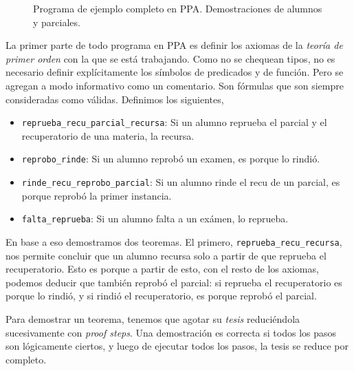 \begin{figure}[H]
    
    \caption{Programa de ejemplo completo en PPA. Demostraciones de alumnos y parciales.}
    \label{ppa:prog:alumnos}
\end{figure}

La primer parte de todo programa en PPA es definir los axiomas de la
\textit{teoría de primer orden} con la que se está trabajando. Como no se
chequean tipos, no es necesario definir explícitamente los símbolos de
predicados y de función. Pero se agregan a modo informativo como un comentario.
Son fórmulas que son siempre consideradas como válidas. Definimos los siguientes,
\begin{itemize}
    \item \lstinline{reprueba_recu_parcial_recursa}: Si un alumno reprueba el
    parcial y el recuperatorio de una materia, la recursa.
    \item \lstinline{reprobo_rinde}: Si un alumno reprobó un examen, es porque lo
    rindió.
    \item \lstinline{rinde_recu_reprobo_parcial}: Si un alumno rinde el recu de
    un parcial, es porque reprobó la primer instancia.
    \item \lstinline{falta_reprueba}: Si un alumno falta a un exámen, lo reprueba.
\end{itemize}



En base a eso demostramos dos teoremas. El primero,
\lstinline{reprueba_recu_recursa}, nos permite concluir que un alumno recursa
solo a partir de que reprueba el recuperatorio. Esto es porque a partir de esto,
con el resto de los axiomas, podemos deducir que también reprobó el parcial: si
reprueba el recuperatorio es porque lo rindió, y si rindió el recuperatorio, es
porque reprobó el parcial.

\begin{figure}[H]
    
\end{figure}

Para demostrar un teorema, tenemos que agotar su \textit{tesis} reduciéndola
sucesivamente con \textit{proof steps}. Una demostración es correcta si todos
los pasos son lógicamente ciertos, y luego de ejecutar todos los pasos, la tesis
se reduce por completo.

